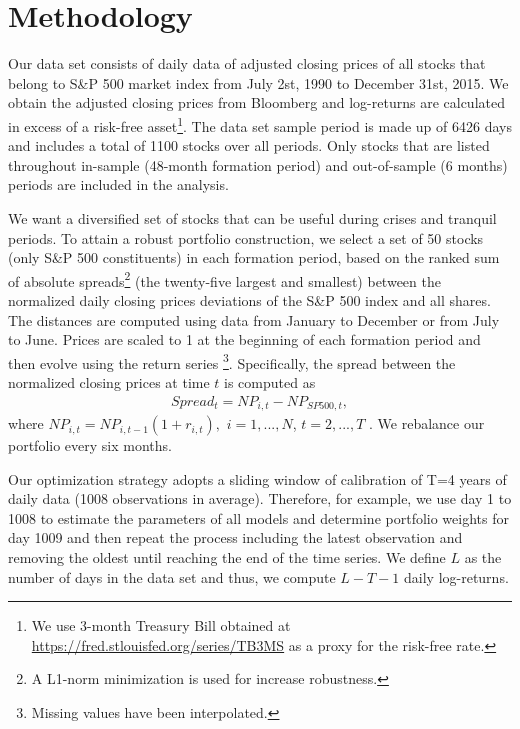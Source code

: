 \documentclass[a4paper,10pt]{article}
\begin{document}
\section{Methodology}

Our data set consists of daily data of adjusted closing prices of all stocks
that belong to S\&P 500 market index from July 2st, 1990 to December 31st,
2015. We obtain the adjusted closing prices from Bloomberg and
log-returns are calculated in excess of a risk-free asset\footnote{%
	We use 3-month Treasury Bill obtained at %
	\url{https://fred.stlouisfed.org/series/TB3MS} as a proxy for the risk-free
	rate.}. The data set sample period is made up of 6426 days and includes a
total of 1100 stocks over all periods. Only stocks that are listed
throughout in-sample (48-month formation period) and out-of-sample (6
months) periods are included in the analysis.

We want a diversified set of stocks that can be useful during crises and
tranquil periods. To attain a robust portfolio construction, we select a set of 50 stocks (only S\&P 500 constituents) in
each formation period, based on the ranked sum of absolute spreads\footnote{A L1-norm minimization is used for increase robustness.} (the twenty-five largest and smallest) between the normalized
daily closing prices deviations of the
S\&P 500 index and all shares. The distances are computed using data from January
to December or from July to June. Prices are scaled to 1 at the beginning of
each formation period and then evolve using the return series \footnote{%
	Missing values have been interpolated.}. Specifically, the spread between
the normalized closing prices at time $t$ is computed as
\begin{equation}
\begin{aligned} Spread_{t}=NP_{i,t}-NP_{SP500,t}, \end{aligned}
\label{eq:eq01}
\end{equation}%
where $NP_{i,t}=NP_{i,t-1}\left( 1+r_{i,t}\right) ,$ $i=1,...,N$, $t=2,...,T$%
. We rebalance our portfolio every six months.

Our optimization strategy adopts a sliding window of calibration of T=4 years of daily data (1008 observations in average). Therefore, for example, we use day 1 to 1008 to
estimate the parameters of all models and determine portfolio weights for
day 1009 and then repeat the process including the latest observation and
removing the oldest until reaching the end of the time series. We define $L$
as the number of days in the data set and thus, we compute $L-T-1$ daily
log-returns.
\end{document}
